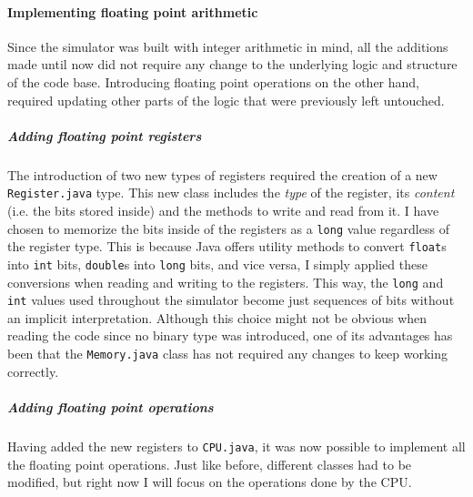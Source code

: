 \paragraph*{Implementing floating point arithmetic}

Since the simulator was built with integer arithmetic in mind, all the additions made until now did not require any change to the underlying logic and structure of the code base. Introducing floating point operations on the other hand, required updating other parts of the logic that were previously left untouched.

\subparagraph*{Adding floating point registers}

The introduction of two new types of registers required the creation of a new \verb|Register.java| type. This new class includes the \emph{type} of the register, its \emph{content} (i.e. the bits stored inside) and the methods to write and read from it. I have chosen to memorize the bits inside of the registers as a \verb|long| value regardless of the register type. This is because Java offers utility methods to convert \verb|float|s into \verb|int| bits, \verb|double|s into \verb|long| bits, and vice versa, I simply applied these conversions when reading and writing to the registers. This way, the \verb|long| and \verb|int| values used throughout the simulator become just sequences of bits without an implicit interpretation. Although this choice might not be obvious when reading the code since no binary type was introduced, one of its advantages has been that the \verb|Memory.java| class has not required any changes to keep working correctly.

\subparagraph*{Adding floating point operations}

Having added the new registers to \verb|CPU.java|, it was now possible to implement all the floating point operations. Just like before, different classes had to be modified, but right now I will focus on the operations done by the CPU.

